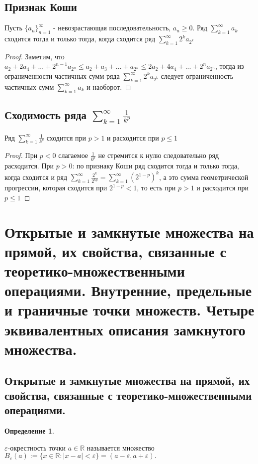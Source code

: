 \documentclass[12pt]{article}
\theoremstyle{definition}
\begin{document}
\subsection{Признак Коши}
Пусть $\textstyle\{a_n\}_{n=1}^{\infty}$ - невозрастающая последовательность, $ a_n \geq 0$. Ряд $\displaystyle\sum_{k = 1}^{\infty}a_k$ сходится тогда и только тогда, когда сходится ряд $\displaystyle\sum_{k = 1}^{\infty}2^k a_{2^k}$
\begin{proof}
Заметим, что $a_2 + 2a_4 + ... + 2^{n-1}a_{2^n} \leq a_2 + a_3 + ... + a_{2^n} \leq 2a_2+ 4a_4 + ... + 2^n a_{2^n}$, тогда из ограниченности частичных сумм ряда $
\displaystyle\sum_{k = 1}^{\infty}2^k a_{2^k}$ следует ограниченность частичных сумм $\displaystyle\sum_{k = 1}^{\infty}a_k$ и наоборот.
\end{proof}

\subsection{Сходимость ряда $\displaystyle\sum_{k = 1}^{\infty}\frac{1}{k^p}$}
Ряд $\displaystyle\sum_{k = 1}^{\infty}\frac{1}{k^p}$ сходится при $p > 1$ и расходится при $p \leq 1$
\begin{proof}
При $p < 0$ слагаемое $\frac{1}{k^p}$ не стремится к нулю следовательно ряд расходится.
При $p > 0$: по признаку Коши ряд сходится тогда и только тогда, когда сходится и ряд $\displaystyle\sum_{k = 1}^{\infty}\frac{2^k}{2^{kp}} = \displaystyle\sum_{k = 1}^{\infty}(2^{1-p})^k$, а это сумма геометрической прогрессии, которая сходится при $2^{1-p} < 1$, то есть при $p > 1$ и расходится при $p \leq 1$
\end{proof}

\section{Открытые и замкнутые множества на прямой, их свойства, связанные с теоретико-множественными операциями. Внутренние, предельные и граничные точки множеств. Четыре эквивалентных описания замкнутого множества.}

\subsection{Открытые и замкнутые множества на прямой, их свойства, связанные с теоретико-множественными операциями.}

\textbf{Определение 1}.

$\varepsilon$-окрестность точки $a \in\mathbb{R}$ называется множество $B_\varepsilon(a) := \{x\in\mathbb{R}: |x-a| < \varepsilon\} = (a-\varepsilon, a +\varepsilon).$
\end{document}
